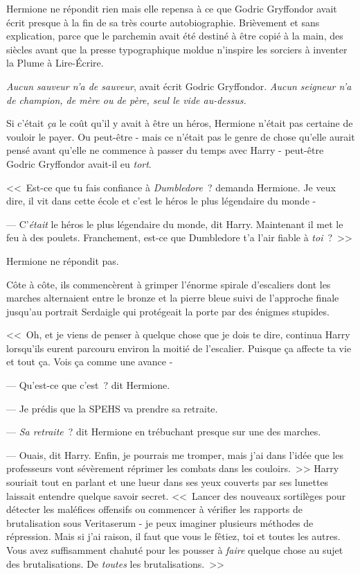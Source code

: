 Hermione ne répondit rien mais elle repensa à ce que Godric Gryffondor avait écrit presque à la fin de sa très courte autobiographie. Brièvement et sans explication, parce que le parchemin avait été destiné à être copié à la main, des siècles avant que la presse typographique moldue n'inspire les sorciers à inventer la Plume à Lire-Écrire.

\emph{Aucun sauveur n'a de sauveur}, avait écrit Godric Gryffondor. \emph{Aucun seigneur n'a de champion, de mère ou de père, seul le vide au-dessus.}

Si c'était \emph{ça} le coût qu'il y avait à être un héros, Hermione n'était pas certaine de vouloir le payer. Ou peut-être - mais ce n'était pas le genre de chose qu'elle aurait pensé avant qu'elle ne commence à passer du temps avec Harry - peut-être Godric Gryffondor avait-il eu \emph{tort}.

<<~Est-ce que tu fais confiance à \emph{Dumbledore}~? demanda Hermione. Je veux dire, il vit dans cette école et c'est le héros le plus légendaire du monde -

--- C'\emph{était} le héros le plus légendaire du monde, dit Harry. Maintenant il met le feu à des poulets. Franchement, est-ce que Dumbledore t'a l'air fiable à \emph{toi}~?~>>

Hermione ne répondit pas.

Côte à côte, ils commencèrent à grimper l'énorme spirale d'escaliers dont les marches alternaient entre le bronze et la pierre bleue suivi de l'approche finale jusqu'au portrait Serdaigle qui protégeait la porte par des énigmes stupides.

<<~Oh, et je viens de penser à quelque chose que je dois te dire, continua Harry lorsqu'ils eurent parcouru environ la moitié de l'escalier. Puisque ça affecte ta vie et tout ça. Vois ça comme une avance -

--- Qu'est-ce que c'est~? dit Hermione.

--- Je prédis que la SPEHS va prendre sa retraite.

--- \emph{Sa retraite}~? dit Hermione en trébuchant presque sur une des marches.

--- Ouais, dit Harry. Enfin, je pourrais me tromper, mais j'ai dans l'idée que les professeurs vont sévèrement réprimer les combats dans les couloirs.~>> Harry souriait tout en parlant et une lueur dans ses yeux couverts par ses lunettes laissait entendre quelque savoir secret. <<~Lancer des nouveaux sortilèges pour détecter les maléfices offensifs ou commencer à vérifier les rapports de brutalisation sous Veritaserum - je peux imaginer plusieurs méthodes de répression. Mais si j'ai raison, il faut que vous le fêtiez, toi et toutes les autres. Vous avez suffisamment chahuté pour les pousser à \emph{faire} quelque chose au sujet des brutalisations. De \emph{toutes} les brutalisations.~>>

